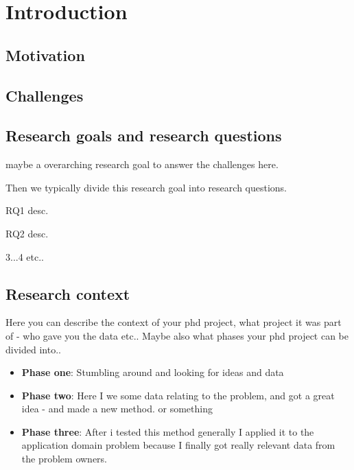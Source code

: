 \chapter{Introduction}
\label{chap:intro}

\section{Motivation}
\label{sec:motivation}
\lipsum[1-2]
\section{Challenges}
\label{intro:sec:intro:challenges}
\lipsum[1-2]

\section{Research goals and research questions}
\label{intro:sec:rquestions}
\begin{tcolorbox}[title=Research goal]
  maybe a overarching research goal to answer the challenges here.
\end{tcolorbox}

Then we typically divide this research goal into research questions.

\begin{tcolorbox}[title=Research question 1]
  \label{rq1}
  RQ1 desc.
\end{tcolorbox}

\begin{tcolorbox}[title=Research question 2]
  \label{rq2}
  RQ2 desc.
\end{tcolorbox}

3...4 etc..

\section{Research context}
\label{sec:researchcontext}
Here you can describe the context of your phd project, what project it was part of - who gave you the data etc..
Maybe also what phases your phd project can be divided into..
\begin{itemize}
\item \textbf{Phase one}: Stumbling around and looking for ideas and data
\item \textbf{Phase two}: Here I we some data relating to the problem, and got a great idea - and made a new method. or something
\item \textbf{Phase three}: After i tested this method generally I applied it to the application domain problem because I finally got really relevant data from the problem owners.
\end{itemize}

